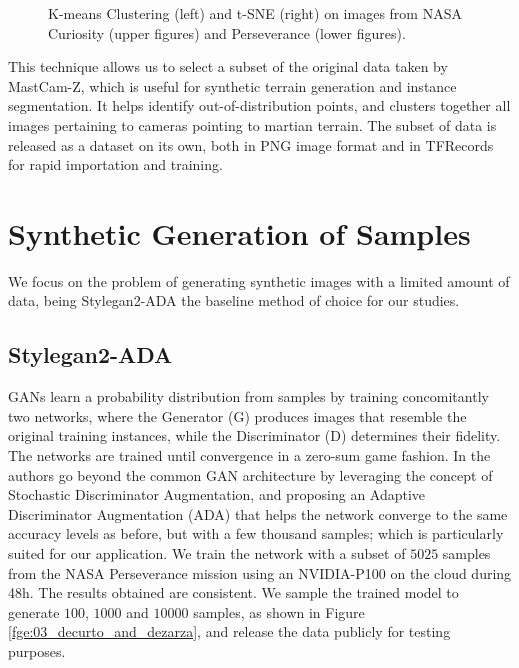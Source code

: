 \documentclass[lettersize,journal]{IEEEtran}
\begin{document}
\begin{figure}[ht]
\centering
{}
\caption{K-means Clustering (left) and t-SNE (right) on images from NASA Curiosity (upper figures) and Perseverance (lower figures).}
\label{fge:01_decurto_and_dezarza}
\end{figure}

This technique allows us to select a subset of the original data taken by MastCam-Z, which is useful for synthetic terrain generation and instance segmentation. It helps identify out-of-distribution points, and clusters together all images pertaining to cameras pointing to martian terrain. The subset of data is released as a dataset 
on its own, both in PNG image format and in TFRecords for rapid importation and training.

\section{Synthetic Generation of Samples}
\label{sn:syntheticsamples}

We focus on the problem of generating synthetic images with a limited amount of data, being Stylegan2-ADA \cite{Karras2020} the baseline method of choice for our studies.

\subsection{Stylegan2-ADA}
GANs learn a probability distribution from samples by training concomitantly two networks, where the Generator (G) produces images that resemble the original training instances, while the Discriminator (D) determines their fidelity. The networks are trained until convergence in a zero-sum game fashion. In \cite{Karras2020} the authors go beyond the common GAN architecture by leveraging the concept of Stochastic Discriminator Augmentation, and proposing an Adaptive Discriminator Augmentation (ADA) that helps the network converge to the same accuracy levels as before, but with a few thousand samples; which is particularly suited for our application. We train the network with a subset of $5025$ samples from the NASA Perseverance mission using an NVIDIA-P100 on the cloud during 48h. The results obtained are consistent. We sample the trained model to generate $100$, $1000$ and $10000$ samples, as shown in Figure \ref{fge:03_decurto_and_dezarza}, and release the data publicly for testing purposes.
\end{document}
